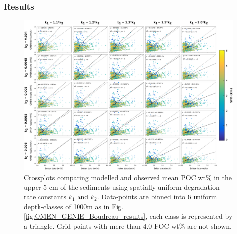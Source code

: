 \documentclass[gmd, manuscript]{copernicus}
\begin{document}
\subsubsection{Results}\label{subsubsec:couplingresultscrossplots}
\begin{figure}[tbp]
\begin{center}
	\includegraphics[width=1.0\textwidth]{figures/OMEN-GENIE-Exp/0_2908_Invariant_k_CROSSPLOT_WITH_REGRESSION.pdf}
	\caption{Crossplots comparing modelled and observed mean POC wt\% in the upper 5 cm of the sediments using spatially uniform degradation rate constants $k_1$ and $k_2$. 
	Data-points are binned into 6 uniform depth-classes of 1000m as in Fig. \ref{fig:OMEN_GENIE_Boudreau_results}, each class is represented by a triangle. 
	Grid-points with more than 4.0 POC wt\% are not shown.}\label{fig:OMEN_GENIE_invariant_results}
\end{center}
\end{figure}
\end{document}

